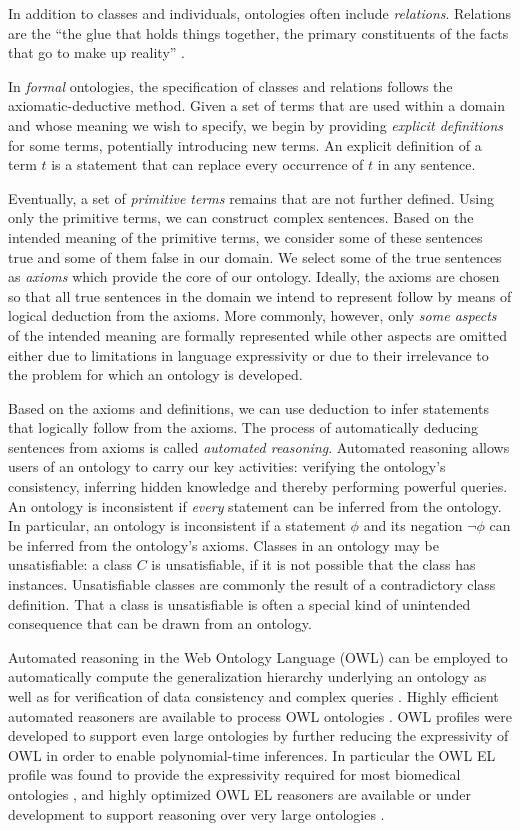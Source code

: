 \documentclass{bioinfo}
\renewcommand{\cite}{\citep}
\begin{document}
In addition to classes and individuals, ontologies often include {\em
  relations}. Relations are the ``the glue that holds things together,
the primary constituents of the facts that go to make up reality''
\cite{}.

In {\em formal} ontologies, the specification of classes and relations
follows the axiomatic-deductive method. Given a set of terms that are
used within a domain and whose meaning we wish to specify, we begin by
providing {\em explicit definitions} for some terms, potentially
introducing new terms. An explicit definition of a term $t$ is a
statement that can replace every occurrence of $t$ in any sentence.

Eventually, a set of {\em primitive terms} remains that are not
further defined. Using only the primitive terms, we can construct
complex sentences. Based on the intended meaning of the primitive
terms, we consider some of these sentences true and some of them false
in our domain. We select some of the true sentences as {\em axioms}
which provide the core of our ontology. Ideally, the axioms are chosen
so that all true sentences in the domain we intend to represent follow
by means of logical deduction from the axioms. More commonly, however,
only {\em some aspects} of the intended meaning are formally
represented while other aspects are omitted either due to limitations
in language expressivity or due to their irrelevance to the problem
for which an ontology is developed.

Based on the axioms and definitions, we can use deduction to infer
statements that logically follow from the axioms.  The process of
automatically deducing sentences from axioms is called {\em automated
  reasoning}. Automated reasoning allows users of an ontology to carry
our key activities: verifying the ontology's consistency, inferring
hidden knowledge and thereby performing powerful queries.  An ontology
is inconsistent if {\em every} statement can be inferred from the
ontology. In particular, an ontology is inconsistent if a statement
$\phi$ and its negation $\neg \phi$ can be inferred from the
ontology's axioms. Classes in an ontology may be unsatisfiable: a
class $C$ is unsatisfiable, if it is not possible that the class has
instances. Unsatisfiable classes are commonly the result of a
contradictory class definition. That a class is unsatisfiable is often
a special kind of unintended consequence that can be drawn from an
ontology.

Automated reasoning in the Web Ontology Language (OWL) can be employed
to automatically compute the generalization hierarchy underlying an
ontology as well as for verification of data consistency and complex
queries \cite{Hoehndorf2011incon, Hoehndorf2011models}. Highly
efficient automated reasoners are available to process OWL ontologies
\cite{Sirin2004, Tsarkov2006, Motik2009a}. OWL profiles were developed
to support even large ontologies by further reducing the expressivity
of OWL in order to enable polynomial-time inferences. In particular
the OWL EL profile was found to provide the expressivity required for
most biomedical ontologies \cite{el4, elvira}, and highly optimized
OWL EL reasoners are available or under development to support
reasoning over very large ontologies \cite{el4, cbreasoner}.
\end{document}
